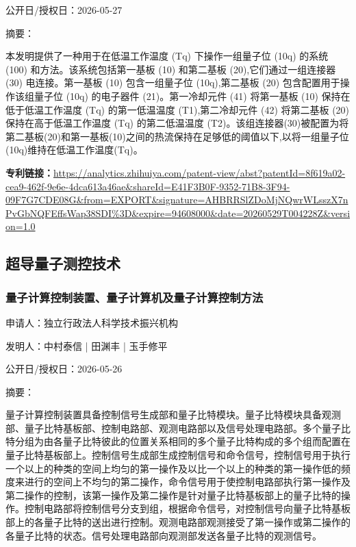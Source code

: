 \documentclass[12pt,a4paper]{ctexart}
\begin{document}
公开日/授权日：2026-05-27

摘要：

本发明提供了一种用于在低温工作温度 (Tq) 下操作一组量子位 (10q) 的系统 (100) 和方法。该系统包括第一基板 (10) 和第二基板 (20),它们通过一组连接器 (30) 电连接。第一基板 (10) 包含一组量子位 (10q),第二基板 (20) 包含配置用于操作该组量子位 (10q) 的电子器件 (21)。第一冷却元件 (41) 将第一基板 (10) 保持在低于低温工作温度 (Tq) 的第一低温温度 (T1),第二冷却元件 (42) 将第二基板 (20) 保持在高于低温工作温度 (Tq) 的第二低温温度 (T2)。该组连接器(30)被配置为将第二基板(20)和第一基板(10)之间的热流保持在足够低的阈值以下,以将一组量子位(10q)维持在低温工作温度(Tq)。

\noindent\textbf{专利链接：}\url{https://analytics.zhihuiya.com/patent-view/abst?patentId=8f619a02-cea9-462f-9e6e-4dca613a46ae&shareId=E41F3B0F-9352-71B8-3F94-09F7G7CDE08G&from=EXPORT&signature=AHBRRSlZDoMjNQwrWLsszX7nPvGbNQFEffsWap38SDI%3D&expire=94608000&date=20260529T004228Z&version=1.0 }



\subsection{ 超导量子测控技术 }



\subsubsection{ 量子计算控制装置、量子计算机及量子计算控制方法 }

申请人：独立行政法人科学技术振兴机构

发明人：中村泰信 | 田渊丰 | 玉手修平

公开日/授权日：2026-05-26

摘要：

量子计算控制装置具备控制信号生成部和量子比特模块。量子比特模块具备观测部、量子比特基板部、控制电路部、观测电路部以及信号处理电路部。多个量子比特分组为由各量子比特彼此的位置关系相同的多个量子比特构成的多个组而配置在量子比特基板部上。控制信号生成部生成控制信号和命令信号，控制信号用于执行一个以上的种类的空间上均匀的第一操作及以比一个以上的种类的第一操作低的频度来进行的空间上不均匀的第二操作，命令信号用于使控制电路部执行第一操作及第二操作的控制，该第一操作及第二操作是针对量子比特基板部上的量子比特的操作。控制电路部将控制信号分支到组，根据命令信号，对控制信号向量子比特基板部上的各量子比特的送出进行控制。观测电路部观测接受了第一操作或第二操作的各量子比特的状态。信号处理电路部向观测部发送各量子比特的观测信号。
\end{document}
